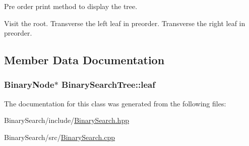 \-Pre order print method to display the tree. 

\-Visit the root. \-Transverse the left leaf in preorder. \-Transverse the right leaf in preorder. 

\subsection{\-Member \-Data \-Documentation}
\hypertarget{classBinarySearchTree_aabe2ce4ce0534f0407136c4a3c02cd54}{
\subsubsection[{leaf}]{\setlength{\rightskip}{0pt plus 5cm}\-Binary\-Node$\ast$ {\bf \-Binary\-Search\-Tree\-::leaf}}}\label{classBinarySearchTree_aabe2ce4ce0534f0407136c4a3c02cd54}


\-The documentation for this class was generated from the following files\-:\begin{DoxyCompactItemize}
\item 
\-Binary\-Search/include/\hyperlink{BinarySearch_8hpp}{\-Binary\-Search.\-hpp}\item 
\-Binary\-Search/src/\hyperlink{BinarySearch_8cpp}{\-Binary\-Search.\-cpp}\end{DoxyCompactItemize}
